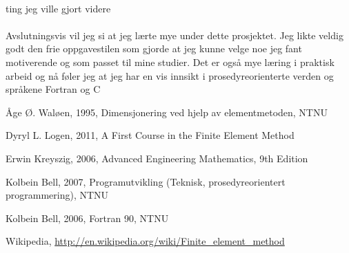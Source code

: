 \documentclass[10pt,a4paper, norsk]{article}
\begin{document}
\paragraph*{}
ting jeg ville gjort videre


\paragraph{}
Avslutningsvis vil jeg si at jeg lærte mye under dette prosjektet. Jeg likte veldig godt den frie oppgavestilen som gjorde at jeg kunne velge noe jeg fant motiverende og som passet til mine studier. Det er også mye læring i praktisk arbeid og nå føler jeg at jeg har en vis innsikt i prosedyreorienterte verden og språkene Fortran og C


\begin{thebibliography}{9}

  Åge Ø. Waløen,
  1995, 
  Dimensjonering ved hjelp av elementmetoden, NTNU
 
	Dyryl L. Logen, 2011, A First Course in the Finite Element Method
	
Erwin Kreyszig, 2006, Advanced Engineering Mathematics, 9th Edition

Kolbein Bell, 2007, Programutvikling (Teknisk, prosedyreorientert programmering), NTNU

Kolbein Bell, 2006, Fortran 90, NTNU

  Wikipedia,
  \url{http://en.wikipedia.org/wiki/Finite_element_method}
  

\end{thebibliography}
\end{document}
